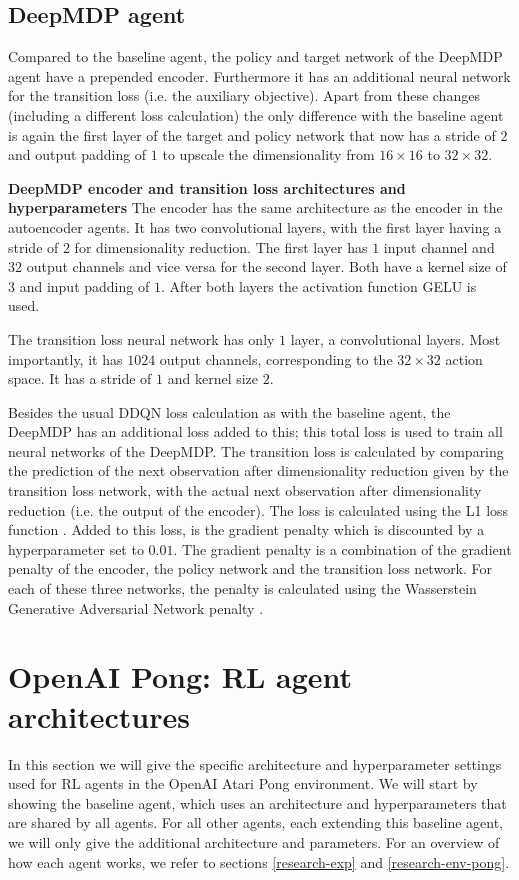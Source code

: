 \subsection{DeepMDP agent}
Compared to the baseline agent, the policy and target network of the DeepMDP agent have a prepended encoder. Furthermore it has an additional neural network for the transition loss (i.e. the auxiliary objective). Apart from these changes (including a different loss calculation) the only difference with the baseline agent is again the first layer of the target and policy network that now has a stride of $2$ and output padding of $1$ to upscale the dimensionality from $16 \times 16$ to $32 \times 32$. \newline

\noindent \textbf{DeepMDP encoder and transition loss architectures and hyperparameters} \newline
\noindent The encoder has the same architecture as the encoder in the autoencoder agents. It has two convolutional layers, with the first layer having a stride of $2$ for dimensionality reduction. The first layer has $1$ input channel and $32$ output channels and vice versa for the second layer. Both have a kernel size of $3$ and input padding of $1$. After both layers the activation function GELU is used.

The transition loss neural network has only $1$ layer, a convolutional layers. Most importantly, it has $1024$ output channels, corresponding to the $32 \times 32$ action space. It has a stride of $1$ and kernel size $2$.

Besides the usual DDQN loss calculation as with the baseline agent, the DeepMDP has an additional loss added to this; this total loss is used to train all neural networks of the DeepMDP. The transition loss is calculated by comparing the prediction of the next observation after dimensionality reduction given by the transition loss network, with the actual next observation after dimensionality reduction (i.e. the output of the encoder). The loss is calculated using the L1 loss function \cite{l1}. Added to this loss, is the gradient penalty which is discounted by a hyperparameter set to $0.01$. The gradient penalty is a combination of the gradient penalty of the encoder, the policy network and the transition loss network. For each of these three networks, the penalty is calculated using the Wasserstein Generative Adversarial Network penalty \cite{wgan}.

\section{OpenAI Pong: RL agent architectures}\label{appendix-agents-pong}
In this section we will give the specific architecture and hyperparameter settings used for RL agents in the OpenAI Atari Pong environment. We will start by showing the baseline agent, which uses an architecture and hyperparameters that are shared by all agents. For all other agents, each extending this baseline agent, we will only give the additional architecture and parameters. For an overview of how each agent works, we refer to sections \ref{research-exp} and \ref{research-env-pong}.



